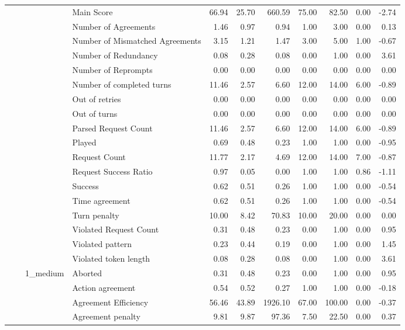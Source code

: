 \begin{tabular}{llllrrrrrrr}
 &  &  & Main Score & 66.94 & 25.70 & 660.59 & 75.00 & 82.50 & 0.00 & -2.74 \\
 &  &  & Number of Agreements & 1.46 & 0.97 & 0.94 & 1.00 & 3.00 & 0.00 & 0.13 \\
 &  &  & Number of Mismatched Agreements & 3.15 & 1.21 & 1.47 & 3.00 & 5.00 & 1.00 & -0.67 \\
 &  &  & Number of Redundancy & 0.08 & 0.28 & 0.08 & 0.00 & 1.00 & 0.00 & 3.61 \\
 &  &  & Number of Reprompts & 0.00 & 0.00 & 0.00 & 0.00 & 0.00 & 0.00 & 0.00 \\
 &  &  & Number of completed turns & 11.46 & 2.57 & 6.60 & 12.00 & 14.00 & 6.00 & -0.89 \\
 &  &  & Out of retries & 0.00 & 0.00 & 0.00 & 0.00 & 0.00 & 0.00 & 0.00 \\
 &  &  & Out of turns & 0.00 & 0.00 & 0.00 & 0.00 & 0.00 & 0.00 & 0.00 \\
 &  &  & Parsed Request Count & 11.46 & 2.57 & 6.60 & 12.00 & 14.00 & 6.00 & -0.89 \\
 &  &  & Played & 0.69 & 0.48 & 0.23 & 1.00 & 1.00 & 0.00 & -0.95 \\
 &  &  & Request Count & 11.77 & 2.17 & 4.69 & 12.00 & 14.00 & 7.00 & -0.87 \\
 &  &  & Request Success Ratio & 0.97 & 0.05 & 0.00 & 1.00 & 1.00 & 0.86 & -1.11 \\
 &  &  & Success & 0.62 & 0.51 & 0.26 & 1.00 & 1.00 & 0.00 & -0.54 \\
 &  &  & Time agreement & 0.62 & 0.51 & 0.26 & 1.00 & 1.00 & 0.00 & -0.54 \\
 &  &  & Turn penalty & 10.00 & 8.42 & 70.83 & 10.00 & 20.00 & 0.00 & 0.00 \\
 &  &  & Violated Request Count & 0.31 & 0.48 & 0.23 & 0.00 & 1.00 & 0.00 & 0.95 \\
 &  &  & Violated pattern & 0.23 & 0.44 & 0.19 & 0.00 & 1.00 & 0.00 & 1.45 \\
 &  &  & Violated token length & 0.08 & 0.28 & 0.08 & 0.00 & 1.00 & 0.00 & 3.61 \\
\cline{3-11}
 &  & \multirow[t]{27}{*}{1_medium} & Aborted & 0.31 & 0.48 & 0.23 & 0.00 & 1.00 & 0.00 & 0.95 \\
 &  &  & Action agreement & 0.54 & 0.52 & 0.27 & 1.00 & 1.00 & 0.00 & -0.18 \\
 &  &  & Agreement Efficiency & 56.46 & 43.89 & 1926.10 & 67.00 & 100.00 & 0.00 & -0.37 \\
 &  &  & Agreement penalty & 9.81 & 9.87 & 97.36 & 7.50 & 22.50 & 0.00 & 0.37 \\

\end{tabular}
